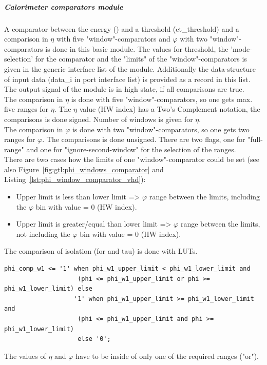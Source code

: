 \subparagraph{Calorimeter comparators module}\label{sec:gtl:calo_comp_module}
A comparator between the energy (\et) and a threshold (et\_threshold) and a comparison in $\eta$ with five "window"-comparators and $\varphi$ with two "window"-comparators
is done in this basic module. The values for \et threshold, the 'mode-selection' for the \et comparator and the "limits" of the "window"-comparators 
is given in the generic interface list of the module. Additionally the data-structure of input data (data\_i in port interface list) is provided
as a record in this list. The output signal of the module is in high state, if all comparisons are true.\\
The comparison in $\eta$ is done with five "window"-comparators, so one gets max. five ranges for $\eta$. The $\eta$ value (HW index) has a Two's Complement notation, the comparisons is done signed. Number of windows is given for $\eta$.\\
The comparison in $\varphi$ is done with two "window"-comparators, so one gets two ranges for $\varphi$. The comparisons is done unsigned. There are two flags, one for "full-range" and one for "ignore-second-window" for the selection of the ranges.\\
There are two cases how the limits of one "window"-comparator could be set (see also Figure~\ref{fig:gtl:phi_windows_comparator} and Listing~\ref{lst:phi_window_comparator_vhd}):
\begin{itemize}
\item Upper limit is less than lower limit => $\varphi$ range between the limits, including the $\varphi$ bin with value = 0 (HW index).
\item Upper limit is greater/equal than lower limit => $\varphi$ range between the limits, not including the $\varphi$ bin with value = 0 (HW index).
\end{itemize}
The comparison of isolation (for \egamma and tau) is done with LUTs.
\begin{lstlisting}[label=lst:phi_window_comparator_vhd,float=here,caption=VHDL code of "window"-comparator in $\varphi$,captionpos=t]
    phi_comp_w1 <= '1' when phi_w1_upper_limit < phi_w1_lower_limit and
                    (phi <= phi_w1_upper_limit or phi >= phi_w1_lower_limit) else
                   '1' when phi_w1_upper_limit >= phi_w1_lower_limit and
                    (phi <= phi_w1_upper_limit and phi >= phi_w1_lower_limit)
                    else '0';
\end{lstlisting}

The values of $\eta$ and $\varphi$ have to be inside of only one of the required ranges ("or").

